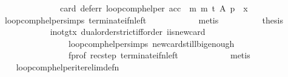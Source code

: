 \begin{isabellebody}
\ \ \ \ \ \ \ \ \ \ \ \ \ \ card\ {\isacharparenleft}{\kern0pt}defer{\isacharunderscore}{\kern0pt}r\ {\isacharparenleft}{\kern0pt}loop{\isacharunderscore}{\kern0pt}comp{\isacharunderscore}{\kern0pt}helper\ {\isacharparenleft}{\kern0pt}acc\ {\isasymtriangleright}\ m{\isacharparenright}{\kern0pt}\ m\ t\ A\ p{\isacharparenright}{\kern0pt}{\isacharparenright}{\kern0pt}\ {\isacharequal}{\kern0pt}\ x{\isachardoublequoteclose}\isanewline
\ \ \ \ \ \ \ \ \ \ \isamarkupfalse%
\ loop{\isacharunderscore}{\kern0pt}comp{\isacharunderscore}{\kern0pt}helper{\isachardot}{\kern0pt}simps{\isacharparenleft}{\kern0pt}{}{\isacharparenright}{\kern0pt}\ terminate{\isacharunderscore}{\kern0pt}if{\isacharunderscore}{\kern0pt}n{\isacharunderscore}{\kern0pt}left\isanewline
\ \ \ \ \ \ \ \ \ \ \isamarkupfalse%
\ metis\isanewline
\ \ \ \ \ \ \ \ \isamarkupfalse%
\ {\isacharquery}{\kern0pt}thesis\isanewline
\ \ \ \ \ \ \ \ \ \ \isamarkupfalse%
\ i{\isacharunderscore}{\kern0pt}not{\isacharunderscore}{\kern0pt}gt{\isacharunderscore}{\kern0pt}x\ dual{\isacharunderscore}{\kern0pt}order{\isachardot}{\kern0pt}strict{\isacharunderscore}{\kern0pt}iff{\isacharunderscore}{\kern0pt}order\ i{\isacharunderscore}{\kern0pt}is{\isacharunderscore}{\kern0pt}new{\isacharunderscore}{\kern0pt}card\isanewline
\ \ \ \ \ \ \ \ \ \ \ \ \ \ \ \ loop{\isacharunderscore}{\kern0pt}comp{\isacharunderscore}{\kern0pt}helper{\isachardot}{\kern0pt}simps{\isacharparenleft}{\kern0pt}{}{\isacharparenright}{\kern0pt}\ new{\isacharunderscore}{\kern0pt}card{\isacharunderscore}{\kern0pt}still{\isacharunderscore}{\kern0pt}big{\isacharunderscore}{\kern0pt}enough\isanewline
\ \ \ \ \ \ \ \ \ \ \ \ \ \ \ \ f{\isacharunderscore}{\kern0pt}prof\ rec{\isacharunderscore}{\kern0pt}step\ terminate{\isacharunderscore}{\kern0pt}if{\isacharunderscore}{\kern0pt}n{\isacharunderscore}{\kern0pt}left\isanewline
\ \ \ \ \ \ \ \ \ \ \isamarkupfalse%
\ metis\isanewline
\ \ \ \ \ \ \isamarkupfalse%
\isanewline
\ \ \ \ \isamarkupfalse%
\isanewline
\ \ \isamarkupfalse%
\isanewline
{}\isamarkupfalse%
%
\endisatagproof
{\isafoldproof}%
%
\isadelimproof
\isanewline
%
\endisadelimproof
\isanewline
{}\isamarkupfalse%
\ loop{\isacharunderscore}{\kern0pt}comp{\isacharunderscore}{\kern0pt}helper{\isacharunderscore}{\kern0pt}iter{\isacharunderscore}{\kern0pt}elim{\isacharunderscore}{\kern0pt}def{\isacharunderscore}{\kern0pt}n{\isacharcolon}{\kern0pt}\isanewline
\ \ \isanewline

\end{isabellebody}
